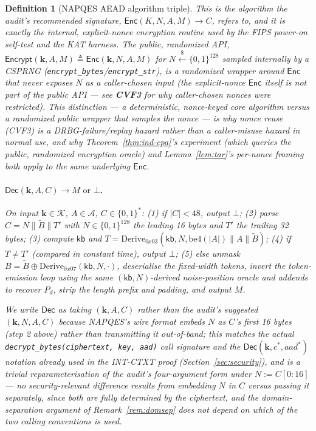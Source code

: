 \documentclass[11pt,a4paper]{article}
\newtheorem{definition}[theorem]{Definition}
\begin{document}
\begin{definition}[NAPQES AEAD algorithm triple]
This is the algorithm the audit's recommended signature,
$\mathsf{Enc}(K,N,A,M)\to C$, refers to, and it is exactly the internal,
explicit-nonce encryption routine used by the FIPS power-on self-test and
the KAT harness. The public, randomized API,
$\mathsf{Encrypt}(\mathbf{k}, A, M) \triangleq \mathsf{Enc}(\mathbf{k}, N, A, M)$
for $N \xleftarrow{\$} \{0,1\}^{128}$ sampled internally by a CSPRNG
(\texttt{encrypt\_bytes}/\texttt{encrypt\_str}), is a randomized wrapper
around $\mathsf{Enc}$ that never exposes $N$ as a caller-chosen input
(the explicit-nonce $\mathsf{Enc}$ itself is not part of the public API —
see \textbf{CVF3} for why caller-chosen nonces were restricted). This
distinction — a deterministic, nonce-keyed core algorithm versus a
randomized public wrapper that samples the nonce — is why nonce reuse
(CVF3) is a DRBG-failure/replay hazard rather than a caller-misuse hazard
in normal use, and why Theorem~\ref{thm:ind-cpa}'s experiment (which
queries the public, randomized encryption oracle) and Lemma~\ref{lem:tar}'s
per-nonce framing both apply to the same underlying $\mathsf{Enc}$.

\paragraph{$\mathsf{Dec}(\mathbf{k}, A, C) \to M \text{ or } \bot$.}
On input $\mathbf{k}\in\mathcal{K}$, $A\in\mathcal{A}$,
$C\in\{0,1\}^{*}$: (1) if $|C| < 48$, output $\bot$; (2) parse
$C = N \| \widetilde{B} \| T'$ with $N \in \{0,1\}^{128}$ the leading 16
bytes and $T'$ the trailing 32 bytes; (3) compute $\mathsf{kb}$ and
$T = \mathrm{Derive}_{0x03}(\mathsf{kb}, N, \mathrm{be4}(|A|)\|A\|\widetilde{B})$;
(4) if $T \neq T'$ (compared in constant time), output $\bot$; (5) else
unmask $B = \widetilde{B} \oplus \mathrm{Derive}_{0x07}(\mathsf{kb}, N, \cdot)$,
deserialise the fixed-width tokens, invert the token-emission loop using the
same $(\mathsf{kb}, N)$-derived noise-position oracle and addends to recover
$P_d$, strip the length prefix and padding, and output $M$.

We write $\mathsf{Dec}$ as taking $(\mathbf{k}, A, C)$ rather than the
audit's suggested $(\mathbf{k}, N, A, C)$ because NAPQES's wire format
embeds $N$ as $C$'s first 16 bytes (step 2 above) rather than transmitting
it out-of-band; this matches the actual \texttt{decrypt\_bytes(ciphertext,
key, aad)} call signature and the $\mathsf{Dec}(\mathbf{k}, c^{*}, aad^{*})$
notation already used in the INT-CTXT proof (Section~\ref{sec:security}),
and is a trivial reparameterisation of the audit's four-argument form under
$N := C[0{:}16]$ — no security-relevant difference results from embedding
$N$ in $C$ versus passing it separately, since both are fully determined by
the ciphertext, and the domain-separation argument of
Remark~\ref{rem:domsep} does not depend on which of the two calling
conventions is used.
\end{definition}
\end{document}
